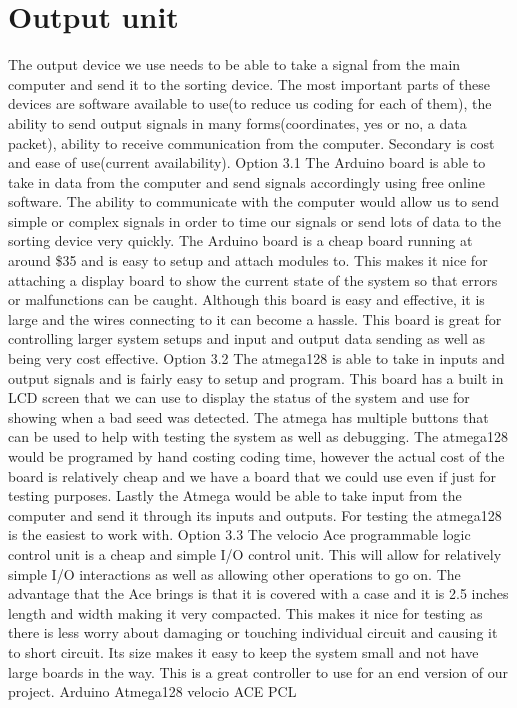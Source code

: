 \documentclass[10pt, letterpaper, twoside, draftclsnofoot, onecolumn. notitlepage]{article}
\begin{document}
\section{Output unit}
\quad 
The output device we use needs to be able to take a signal from the main computer and send it to the sorting device. The most important parts of these devices are software available to use(to reduce us coding for each of them), the ability to send output signals in many forms(coordinates, yes or no, a data packet), ability to receive communication from the computer. Secondary is cost and ease of use(current availability). 
Option 3.1 The Arduino board is able to take in data from the computer and send signals accordingly using free online software. The ability to communicate with the computer would allow us to send simple or complex signals in order to time our signals or send lots of data to the sorting device very quickly. The Arduino board is a cheap board running at around \$35 and is easy to setup and attach modules to. This makes it nice for attaching a display board to show the current state of the system so that errors or malfunctions can be caught. Although this board is easy and effective, it is large and the wires connecting to it can become a hassle. This board is great for controlling larger system setups and input and output data sending as well as being very cost effective.
Option 3.2 The atmega128 is able to take in inputs and output signals and is fairly easy to setup and program. This board has a built in LCD screen that we can use to display the status of the system and use for showing when a bad seed was detected. The atmega has multiple buttons that can be used to help with testing the system as well as debugging. The atmega128 would be programed by hand costing coding time, however the actual cost of the board is relatively cheap and we have a board that we could use even if just for testing purposes. Lastly the Atmega would be able to take input from the computer and send it through its inputs and outputs. For testing the atmega128 is the easiest to work with.
Option 3.3   The velocio Ace programmable logic control unit is a cheap and simple I/O control unit. This will allow for relatively simple I/O interactions as well as allowing other operations to go on. The advantage that the Ace brings is that it is covered with a case and it is 2.5 inches length and width making it very compacted. This makes it nice for testing as there is less worry about damaging or touching individual circuit and causing it to short circuit. Its size makes it easy to keep the system small and not have large boards in the way. This is a great controller to use for an end version of our project.  Arduino  Atmega128  velocio ACE PCL \newline
\end{document}
